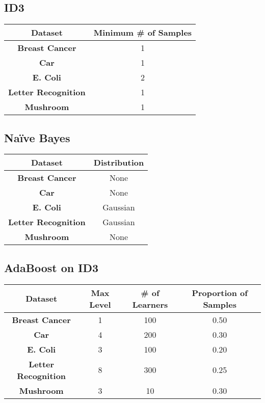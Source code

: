 \documentclass[11pt,titlepage]{article}
\newcommand{\bb}{\textbf}
\begin{document}
\subsection{ID3}
\begin{tabular}{ |c|c| } \hline
  \bb{Dataset}            & \bb{Minimum \# of Samples} \\ \hline
  \bb{Breast Cancer}      & 1                          \\ \hline
  \bb{Car}                & 1                          \\ \hline
  \bb{E. Coli}            & 2                          \\ \hline
  \bb{Letter Recognition} & 1                          \\ \hline
  \bb{Mushroom}           & 1                          \\ \hline
\end{tabular}


\subsection{Naïve Bayes}
\begin{tabular}{ |c|c| } \hline
  \bb{Dataset}            & \bb{Distribution} \\ \hline
  \bb{Breast Cancer}      & None              \\ \hline
  \bb{Car}                & None              \\ \hline
  \bb{E. Coli}            & Gaussian          \\ \hline
  \bb{Letter Recognition} & Gaussian          \\ \hline
  \bb{Mushroom}           & None              \\ \hline
\end{tabular}

\subsection{AdaBoost on ID3}
\begin{tabular}{ |c|c|c|c| } \hline
  \bb{Dataset}            & \bb{Max Level} & \bb{\# of Learners} & \bb{Proportion of Samples} \\ \hline
  \bb{Breast Cancer}      & 1              & 100                 & 0.50                       \\ \hline
  \bb{Car}                & 4              & 200                 & 0.30                       \\ \hline
  \bb{E. Coli}            & 3              & 100                 & 0.20                       \\ \hline
  \bb{Letter Recognition} & 8              & 300                 & 0.25                       \\ \hline
  \bb{Mushroom}           & 3              & 10                  & 0.30                       \\ \hline
\end{tabular}
\end{document}
